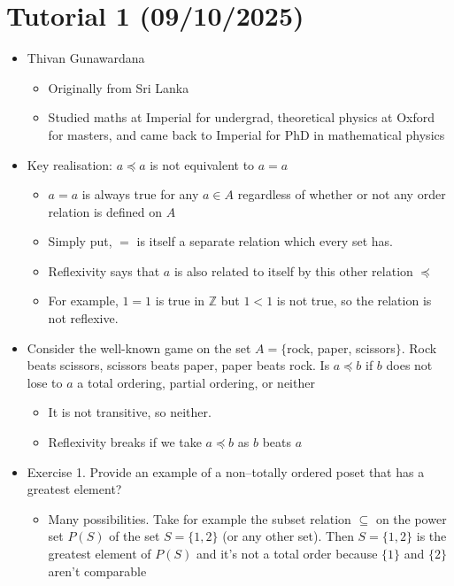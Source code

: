\documentclass{article}
\begin{document}
\section{Tutorial 1 (09/10/2025)}
\begin{itemize}
    \item Thivan Gunawardana
    \begin{itemize}
        \item Originally from Sri Lanka
        \item Studied maths at Imperial for undergrad, theoretical physics at Oxford for masters, and came back to Imperial for PhD in mathematical physics
    \end{itemize}
    \item Key realisation: $a \preceq a$ is not equivalent to $a=a$
    \begin{itemize}
        \item $a=a$ is always true for any $a \in A$ regardless of whether or not any order relation is defined on $A$
        \item Simply put, $=$ is itself a separate relation which every set has.
        \item Reflexivity says that $a$ is also related to itself by this other relation $\preceq$
        \item For example, $1=1$ is true in $\mathbb{Z}$ but $1<1$ is not true, so the relation is not reflexive.
    \end{itemize}
    \item Consider the well-known game on the set $A = \{$rock, paper, scissors$\}$. Rock beats scissors, scissors beats paper, paper beats rock. Is $a \preceq b$ if $b$ does not lose to $a$ a total ordering, partial ordering, or neither 
    \begin{itemize}
        \item It is not transitive, so neither.
        \item Reflexivity breaks if we take $a \preceq b$ as $b$ beats $a$
    \end{itemize}
    \item Exercise 1. Provide an example of a non–totally ordered poset that has a greatest element?
    \begin{itemize}
        \item Many possibilities. Take for example the subset relation $\subseteq$ on the power set $P(S)$ of the set $S = \{1, 2\}$ (or any other set). Then $S = \{1, 2\}$ is the greatest element of $P(S)$ and it’s not a total order because $\{1\}$ and $\{2\}$ aren’t comparable

\end{itemize}
\end{itemize}
\end{document}
